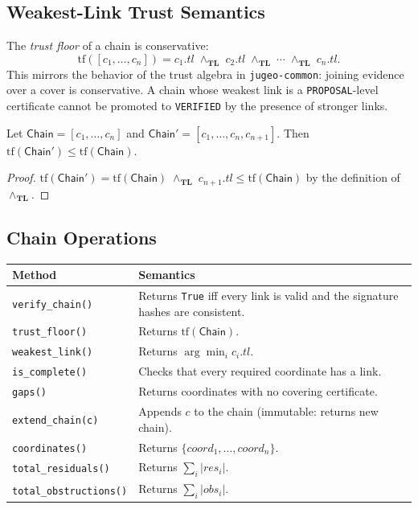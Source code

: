 \documentclass[11pt]{article}
\newcommand{\Chain}{\mathsf{Chain}}            %
\newcommand{\certcoord}{\mathit{coord}}        %
\newcommand{\certtrust}{\mathit{tl}}           %
\newcommand{\certresid}{\mathit{res}}          %
\newcommand{\certobstr}{\mathit{obs}}          %
\newcommand{\TL}{\mathbf{TL}}                  %
\newcommand{\tlmin}{\wedge_{\TL}}             %
\begin{document}
\subsection{Weakest-Link Trust Semantics}

The \emph{trust floor} of a chain is conservative:
\[
  \mathrm{tf}([c_1,\ldots,c_n]) = c_1.\certtrust \;\tlmin\; c_2.\certtrust
    \;\tlmin\; \cdots \;\tlmin\; c_n.\certtrust.
\]
This mirrors the behavior of the trust algebra in \texttt{jugeo-common}:
joining evidence over a cover is conservative.
A chain whose weakest link is a \texttt{PROPOSAL}-level certificate
cannot be promoted to \texttt{VERIFIED} by the presence of stronger links.

\begin{proposition}\label{prop:weakest-link}
Let $\Chain = [c_1,\ldots,c_n]$ and $\Chain' = [c_1,\ldots,c_n,c_{n+1}]$.
Then $\mathrm{tf}(\Chain') \le \mathrm{tf}(\Chain)$.
\end{proposition}
\begin{proof}
$\mathrm{tf}(\Chain') = \mathrm{tf}(\Chain) \;\tlmin\; c_{n+1}.\certtrust \le \mathrm{tf}(\Chain)$
by the definition of $\tlmin$.
\end{proof}

\subsection{Chain Operations}

\begin{center}
\begin{tabular}{lp{8.5cm}}
\toprule
\textbf{Method} & \textbf{Semantics} \\
\midrule
\texttt{verify\_chain()} & Returns \texttt{True} iff every link is valid and
  the signature hashes are consistent. \\
\texttt{trust\_floor()} & Returns $\mathrm{tf}(\Chain)$. \\
\texttt{weakest\_link()} & Returns $\arg\min_i c_i.\certtrust$. \\
\texttt{is\_complete()} & Checks that every required coordinate has a link. \\
\texttt{gaps()} & Returns coordinates with no covering certificate. \\
\texttt{extend\_chain(c)} & Appends $c$ to the chain (immutable: returns new chain). \\
\texttt{coordinates()} & Returns $\{\certcoord_1,\ldots,\certcoord_n\}$. \\
\texttt{total\_residuals()} & Returns $\sum_i |\certresid_i|$. \\
\texttt{total\_obstructions()} & Returns $\sum_i |\certobstr_i|$. \\
\bottomrule
\end{tabular}
\end{center}
\end{document}
